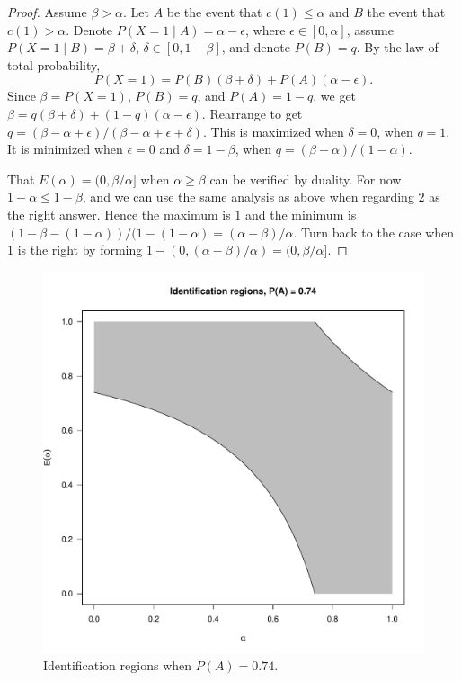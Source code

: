 \begin{proof}
Assume $\beta>\alpha$. Let $A$ be the event that $c(1)\leq\alpha$
and $B$ the event that $c(1)>\alpha$. Denote $P(X=1\mid A)=\alpha-\epsilon$,
where $\epsilon\in[0,\alpha]$, assume $P(X=1\mid B)=\beta+\delta$,
$\delta\in[0,1-\beta]$, and denote $P(B)=q$. By the law of total
probability,
\[
P(X=1)=P(B)(\beta+\delta)+P(A)(\alpha-\epsilon).
\]
Since $\beta=P(X=1)$, $P(B)=q$, and $P(A)=1-q$, we get $\beta=q(\beta+\delta)+(1-q)(\alpha-\epsilon).$
Rearrange to get $q=(\beta-\alpha+\epsilon)/(\beta-\alpha+\epsilon+\delta)$.
This is maximized when $\delta=0$, when $q=1$. It is minimized when
$\epsilon=0$ and $\delta=1-\beta$, when $q=(\beta-\alpha)/(1-\alpha).$

That $E(\alpha)=(0,\beta/\alpha]$ when $\alpha\geq\beta$ can be
verified by duality. For now $1-\alpha\leq1-\beta$, and we can use
the same analysis as above when regarding $2$ as the right answer.
Hence the maximum is $1$ and the minimum is $(1-\beta-(1-\alpha))/(1-(1-\alpha)=(\alpha-\beta)/\alpha$.
Turn back to the case when $1$ is the right by forming $1-(0,(\alpha-\beta)/\alpha)=(0,\beta/\alpha].$
\end{proof}
\begin{figure}
\noindent \begin{centering}
\includegraphics[scale=0.5]{chunks/knowing}
\par\end{centering}
\caption{\label{fig:Identification-regions-guessing}Identification regions
when $P(A)=0.74$.}
\end{figure}

